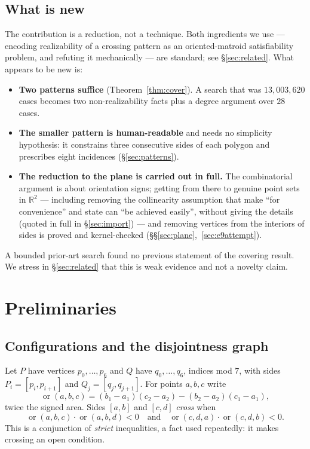 \documentclass[11pt,a4paper]{article}
\theoremstyle{plain}
\theoremstyle{definition}
\theoremstyle{remark}
\newcommand{\orient}{\operatorname{or}}
\begin{document}
\subsection{What is new}

The contribution is a reduction, not a technique. Both ingredients we use ---
encoding realizability of a crossing pattern as an oriented-matroid
satisfiability problem, and refuting it mechanically --- are standard; see
\S\ref{sec:related}. What appears to be new is:

\begin{itemize}[leftmargin=*]
  \item \textbf{Two patterns suffice} (Theorem~\ref{thm:cover}). A search that
    was $13{,}003{,}620$ cases becomes two non-realizability facts plus a
    degree argument over $28$ cases.
  \item \textbf{The smaller pattern is human-readable} and needs no simplicity
    hypothesis: it constrains three consecutive sides of each polygon and
    prescribes eight incidences (\S\ref{sec:patterns}).
  \item \textbf{The reduction to the plane is carried out in full.} The
    combinatorial argument is about orientation signs; getting from there to
    genuine point sets in $\mathbb{R}^2$ --- including removing the
    collinearity assumption that \cite[\S3]{AckermanKeszeghRote2022} make ``for
    convenience'' and state can ``be achieved easily'', without giving the
    details (quoted in full in \S\ref{sec:import}) --- and removing vertices
    from the interiors of sides is proved and kernel-checked
    (\S\S\ref{sec:plane},~\ref{sec:e9attempt}).
\end{itemize}

A bounded prior-art search found no previous statement of the covering result.
We stress in \S\ref{sec:related} that this is weak evidence and not a novelty
claim.

\section{Preliminaries}\label{sec:prelim}

\subsection{Configurations and the disjointness graph}

Let $P$ have vertices $p_0,\dots,p_6$ and $Q$ have $q_0,\dots,q_6$, indices mod
$7$, with sides $P_i=[p_i,p_{i+1}]$ and $Q_j=[q_j,q_{j+1}]$. For points
$a,b,c$ write
\[
  \orient(a,b,c)=(b_1-a_1)(c_2-a_2)-(b_2-a_2)(c_1-a_1),
\]
twice the signed area. Sides $[a,b]$ and $[c,d]$ \emph{cross} when
\[
  \orient(a,b,c)\cdot\orient(a,b,d)<0
  \quad\text{and}\quad
  \orient(c,d,a)\cdot\orient(c,d,b)<0 .
\]
This is a conjunction of \emph{strict} inequalities, a fact used repeatedly: it
makes crossing an open condition.
\end{document}
